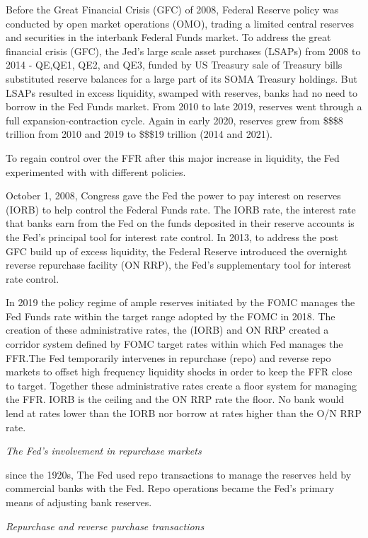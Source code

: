 \documentclass[
]{article}
\begin{document}
Before the Great Financial Crisis (GFC) of 2008, Federal Reserve policy was conducted by open market operations (OMO), trading a limited central reserves and securities in the interbank Federal Funds market. To address the great financial crisis (GFC), the Jed's large scale asset purchases (LSAPs) from 2008 to 2014 - QE,QE1, QE2, and QE3, funded by US Treasury sale of Treasury bills substituted reserve balances for a large part of its SOMA Treasury holdings. But LSAPs resulted in excess liquidity, swamped with reserves, banks had no need to borrow in the Fed Funds market. From 2010 to late 2019, reserves went through a full expansion-contraction cycle. Again in early 2020, reserves grew from \$\$\$8 trillion from 2010 and 2019 to \$\$\$19 trillion (2014 and 2021).

To regain control over the FFR after this major increase in liquidity, the Fed experimented with with different policies.

October 1, 2008, Congress gave the Fed the power to pay interest on reserves (IORB) to help control the Federal Funds rate. The IORB rate, the interest rate that banks earn from the Fed on the funds deposited in their reserve accounts is the Fed's principal tool for interest rate control. In 2013, to address the post GFC build up of excess liquidity, the Federal Reserve introduced the overnight reverse repurchase facility (ON RRP), the Fed's supplementary tool for interest rate control.

In 2019 the policy regime of ample reserves initiated by the FOMC manages the Fed Funds rate within the target range adopted by the FOMC in 2018. The creation of these administrative rates, the (IORB) and ON RRP created a corridor system defined by FOMC target rates within which Fed manages the FFR.The Fed temporarily intervenes in repurchase (repo) and reverse repo markets to offset high frequency liquidity shocks in order to keep the FFR close to target. Together these administrative rates create a floor system for managing the FFR. IORB is the ceiling and the ON RRP rate the floor. No bank would lend at rates lower than the IORB nor borrow at rates higher than the O/N RRP rate.

\emph{The Fed's involvement in repurchase markets}

since the 1920s, The Fed used repo transactions to manage the reserves held by commercial banks with the Fed. Repo operations became the Fed's primary means of adjusting bank reserves.

\emph{Repurchase and reverse purchase transactions}
\end{document}

